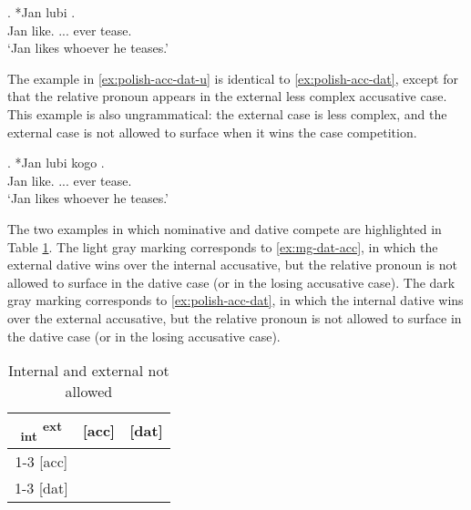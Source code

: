 \exg. *Jan lubi   .\\
Jan like. ... ever tease.\\
`Jan likes whoever he teases.' \label{ex:polish-acc-dat}

The example in \ref{ex:polish-acc-dat-u} is identical to \ref{ex:polish-acc-dat}, except for that the relative pronoun appears in the external less complex accusative case. This example is also ungrammatical: the external case is less complex, and the external case is not allowed to surface when it wins the case competition.

\exg. *Jan lubi kogo  .\\
Jan like. ... ever tease.\\
`Jan likes whoever he teases.' \label{ex:polish-acc-dat-u}

The two examples in which nominative and dative compete are highlighted in Table \ref{tbl:case-competition-polish}. The light gray marking corresponds to \ref{ex:mg-dat-acc}, in which the external dative wins over the internal accusative, but the relative pronoun is not allowed to surface in the dative case (or in the losing accusative case). The dark gray marking corresponds to \ref{ex:polish-acc-dat}, in which the internal dative wins over the external accusative, but the relative pronoun is not allowed to surface in the dative case (or in the losing accusative case).

\begin{table}[H]
  \center
  \caption{Internal and external not allowed}
  \begin{tabular}{c|c|c}
    \toprule
    \textsubscript{\ac{int}} \textsuperscript{\ac{ext}}
           & [\ac{acc}]
           & [\ac{dat}]
           \\ \cmidrule{1-3}
       [\ac{acc}]
           & \xcancel{\phantom{xx}}
           & \cellcolor{LG}{*}
           \\ \cmidrule{1-3}
       [\ac{dat}]
           & \cellcolor{DG}{*}
           & \xcancel{\phantom{xx}}
           \\
     \bottomrule
  \end{tabular}
    \label{tbl:case-competition-polish}
\end{table}

